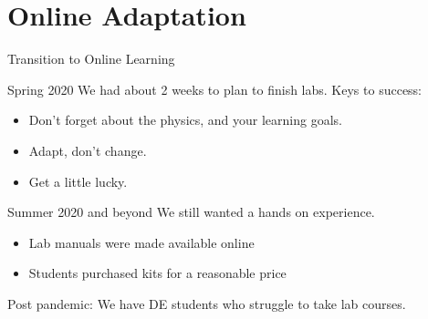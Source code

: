 \documentclass[xcolor=dvipsnames,table]{beamer}
\begin{document}
\section{Online Adaptation}
{\nologo
\begin{frame}{Transition to Online Learning}
  \begin{block}{Spring 2020}
    We had about 2 weeks to plan to finish labs. Keys to success:
    \begin{itemize}
      \item Don't forget about the physics, and your learning goals.
      \item Adapt, don't change.
      \item Get a little lucky.  
    \end{itemize}
  \end{block}
  \begin{block}{Summer 2020 and beyond}
    We still wanted a hands on experience.
    \begin{itemize}
      \item Lab manuals were made available online
      \item Students purchased kits for a reasonable price
    \end{itemize}
    Post pandemic: We have DE students who struggle to take lab courses.
  \end{block}
\end{frame}

}
\end{document}
